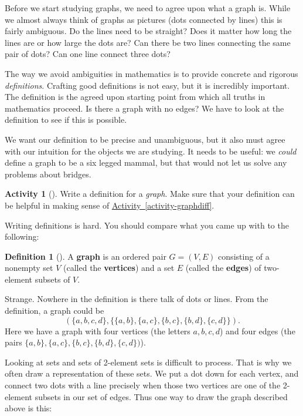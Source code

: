 \documentclass[10pt,]{book}
\newcommand{\terminology}[1]{\textbf{#1}}
\theoremstyle{plain}
\theoremstyle{definition}
\newtheorem{definition}[theorem]{Definition}
\theoremstyle{definition}
\theoremstyle{definition}
\newtheorem{activity}[project]{Activity}
\numberwithin{equation}{chapter}
\begin{document}
\hypertarget{p-31}{}%
Before we start studying graphs, we need to agree upon what a graph is.  		While we almost always think of graphs as pictures (dots connected by lines) this is fairly ambiguous.  Do the lines need to be straight?  Does it matter how long the lines are or how large the dots are?  Can there be two lines connecting the same pair of dots?  Can one line connect three dots?%
\par
\hypertarget{p-32}{}%
The way we avoid ambiguities in mathematics is to provide concrete and rigorous \emph{definitions}.  Crafting good definitions is not easy, but it is incredibly important.  The definition is the agreed upon starting point from which all truths in mathematics proceed.  Is there a graph with no edges?  We have to look at the definition to see if this is possible.%
\par
\hypertarget{p-33}{}%
We want our definition to be precise and unambiguous, but it also must agree with our intuition for the objects we are studying.  It needs to be useful: we \emph{could} define a graph to be a six legged mammal, but that would not let us solve any problems about bridges.%
\begin{activity}[]\label{activity-3}
\hypertarget{p-34}{}%
Write a definition for a \emph{graph}.  Make sure that your definition can be helpful in making sense of \hyperref[activity-graphdiff]{Activity~\ref{activity-graphdiff}}.%
\end{activity}
\hypertarget{p-35}{}%
Writing definitions is hard.  You should compare what you came up with to the following:%
\begin{definition}[{}]\label{definition-1}
\hypertarget{p-36}{}%
A \terminology{graph} is an ordered pair \(G = (V, E)\) consisting of a nonempty set \(V\) (called the \terminology{vertices}) and a set \(E\) (called the \terminology{edges}) of two-element subsets of \(V\).%
\end{definition}
\hypertarget{p-37}{}%
Strange.  Nowhere in the definition is there talk of dots or lines.  From the definition, a graph could be%
\begin{equation*}
(\{a,b,c,d\}, \{\{a,b\}, \{a,c\}, \{b,c\}, \{b,d\}, \{c,d\}\}).
\end{equation*}
Here we have a graph with four vertices  (the letters \(a, b, c, d\)) and four edges (the pairs \(\{a,b\}, \{a,c\}, \{b,c\}, \{b,d\}, \{c,d\})\)).%
\par
\hypertarget{p-38}{}%
Looking at sets and sets of 2-element sets is difficult to process.  That is why we often draw a representation of these sets.  We put a dot down for each vertex, and connect two dots with a line precisely when those two vertices are one of the 2-element subsets in our set of edges.  Thus one way to draw the graph described above is this:%
\end{document}
